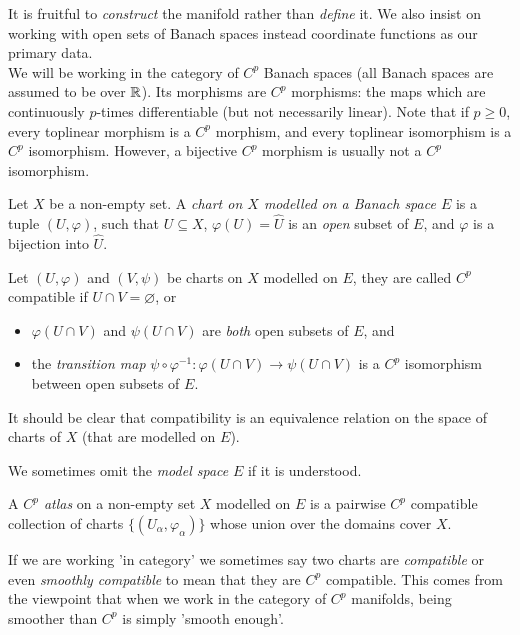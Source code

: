 \documentclass[../main-manifolds.tex]{subfiles}
\begin{document}
It is fruitful to \emph{construct} the manifold rather than \emph{define} it. We also insist on working with open sets of Banach spaces instead coordinate functions as our primary data.\\

We will be working in the category of $C^p$ Banach spaces (all Banach spaces are assumed to be over $\mathbb{R}$). Its morphisms are $C^p$ morphisms: the maps which are continuously $p$-times differentiable (but not necessarily linear). Note that if $p\geq 0$, every toplinear morphism is a $C^p$ morphism, and every toplinear isomorphism is a $C^p$ isomorphism. However, a bijective $C^p$ morphism is usually not a $C^p$ isomorphism. 

\begin{definition}[Chart]\label{def:chart}
    Let $X$ be a non-empty set. A \emph{chart on $X$ modelled on a Banach space $E$} is a tuple $(U,\varphi)$, such that $U\subseteq X$,  $\varphi(U)=\hat{U}$ is an \emph{open} subset of $E$, and $\varphi$ is a bijection into $\hat{U}$.
\end{definition}
\begin{definition}[Compatibility]\label{def:compatibility}
    Let $(U,\varphi)$ and $(V,\psi)$ be charts on $X$ modelled on $E$, they are called $C^p$ compatible if $U\cap V=\varnothing$, or 
    \begin{itemize}
        \item $\varphi(U\cap V)$ and $\psi(U\cap V)$ are \emph{both} open subsets of $E$, and
        \item the \emph{transition map} $\psi\circ\varphi^{-1}: \varphi(U\cap V)\to \psi(U\cap V)$ is a $C^p$ isomorphism between open subsets of $E$.
    \end{itemize}
    It should be clear that compatibility is an equivalence relation on the space of charts of $X$ (that are modelled on $E$).
\end{definition}
\begin{remark}
    We sometimes omit the \emph{model space} $E$ if it is understood.
\end{remark}

\begin{definition}[Atlas]\label{def:atlas}
    A \emph{$C^p$ atlas} on a non-empty set $X$ modelled on $E$ is a pairwise $C^p$ compatible collection of charts $\{(U_\alpha,\varphi_\alpha)\}$ whose union over the domains cover $X$.
\end{definition}
\begin{remark}
    If we are working 'in category' we sometimes say two charts are \emph{compatible} or even \emph{smoothly compatible} to mean that they are $C^p$ compatible. This comes from the viewpoint that when we work in the category of $C^p$ manifolds, being smoother than $C^p$ is simply 'smooth enough'.
\end{remark}
\end{document}
